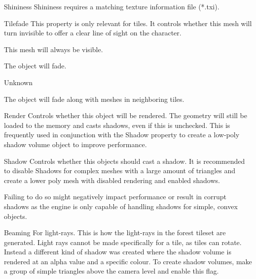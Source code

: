 \begin{propertyAurora}{Shininess}
Shininess requires a matching texture information file (*.txi).
\end{propertyAurora}

\begin{propertyAurora}{Tilefade}
This property is only relevant for tiles. It controls whether this 
mesh will turn invisible to offer a clear line of sight on the character.
\begin{description}[leftmargin=6em,style=nextline]
    \item[None] This mesh will always be visible.
    \item[Fade] The object will fade.
    \item[Base] Unknown
    \item[Neighbor] The object will fade along with meshes in neighboring tiles.
\end{description}
\end{propertyAurora}

\begin{propertyAurora}{Render}
Controls whether this object will be rendered. The geometry will still be loaded to the memory and 
casts shadows, even if this is unchecked. This is frequently used in conjunction with the Shadow
property to create a low-poly shadow volume object to improve performance.
\end{propertyAurora}

\begin{propertyAurora}{Shadow}
Controls whether this objects should cast a shadow. It is recommended to 
disable Shadows for complex meshes with a large amount of triangles and create 
a lower poly mesh with disabled rendering and enabled shadows.

Failing to do so might negatively impact performance or result in corrupt shadows as 
the engine is only capable of handling shadows for simple, convex objects.
\end{propertyAurora}

\begin{propertyAurora}{Beaming}
For light-rays. This is how the light-rays in the forest tileset are generated. 
Light rays cannot be made specifically for a tile, as tiles can rotate.
Instead a different kind of shadow was created where the shadow
volume is rendered at an alpha value and a specific colour. To create shadow
volumes, make a group of simple triangles above the camera level and enable
this flag.
\end{propertyAurora}

